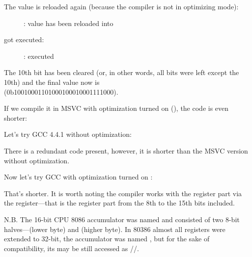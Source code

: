 \clearpage
The value is reloaded again (because the compiler is not in optimizing mode): 

\begin{figure}[H]
\centering
{}
\caption{\olly: value has been reloaded into \EDX}
\label{fig:set_reset_olly3}
\end{figure}

\clearpage
\AND got executed:

\begin{figure}[H]
\centering
{}
\caption{\olly: \AND executed}
\label{fig:set_reset_olly4}
\end{figure}

The 10th bit has been cleared (or, in other words, all bits were left except the 10th) and the final value now is \\
 (0b1001000110100010001{\color{red}0}001111000).


If we compile it in MSVC with optimization turned on (\Ox), the code is even shorter:




Let's try GCC 4.4.1 without optimization:



There is a redundant code present, however, it is shorter than the MSVC version without optimization.

Now let's try GCC with optimization turned on \Othree:




That's shorter.
It is worth noting the compiler works with the \EAX register part via the \AH register---that is the \EAX register part from the 8th to the 15th bits included.


N.B.  The 16-bit CPU 8086 accumulator was named \AX and consisted of two 8-bit 
halves---\AL (lower byte) and \AH (higher byte).
In 80386 almost all registers were extended to 32-bit, the accumulator was named \EAX, 
but for the sake of compatibility,
its  may be still accessed as \AX/\AH/\AL.

